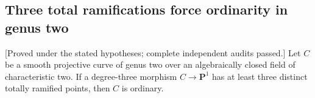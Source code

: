 \subsection{Three total ramifications force ordinarity in genus two}

\begin{lemma}
\label{lem:char2-genus-two-three-total-ramifications-candidate}
\textup{[Proved under the stated hypotheses; complete independent audits passed.]}
Let $C$ be a smooth projective curve of genus two over an algebraically
closed field of characteristic two. If a degree-three morphism
$C\to\mathbf P^1$ has at least three distinct totally ramified
points, then $C$ is ordinary.
\end{lemma}

